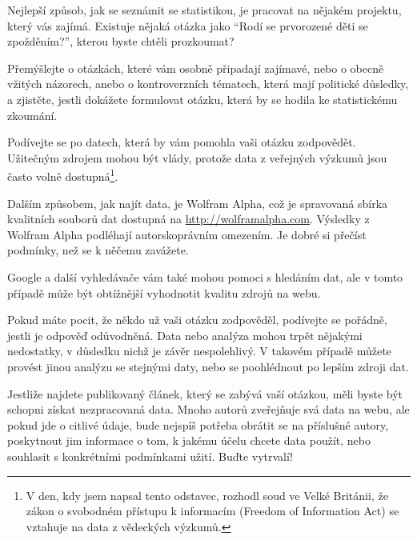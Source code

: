 \documentclass[12pt]{book}
\begin{document}
\begin{exercise}
Nejlepší způsob, jak se seznámit se statistikou, je pracovat na nějakém projektu, který vás zajímá. Existuje nějaká otázka jako ``Rodí se prvorozené děti se zpožděním?'', kterou byste chtěli prozkoumat?

Přemýšlejte o otázkách, které vám osobně připadají zajímavé, nebo o obecně vžitých názorech, anebo o kontroverzních tématech, která mají politické důsledky, a zjistěte, jestli dokážete formulovat otázku, která by se hodila ke statistickému zkoumání.

Podívejte se po datech, která by vám pomohla vaši otázku zodpovědět. Užitečným zdrojem mohou být vlády, protože data z veřejných výzkumů jsou často volně dostupná\footnote{V den, kdy jsem napsal tento odstavec, rozhodl soud ve Velké Británii, že zákon o svobodném přístupu k informacím (Freedom of Information Act) se vztahuje na data z vědeckých výzkumů.}.

Dalším způsobem, jak najít data, je Wolfram Alpha, což je spravovaná sbírka kvalitních souborů dat dostupná na
\url{http://wolframalpha.com}.
Výsledky z Wolfram Alpha podléhají autorskoprávním omezením. Je dobré si přečíst podmínky, než se k něčemu zavážete.

Google a další vyhledávače vám také mohou pomoci s hledáním dat, ale v tomto případě může být obtížnější vyhodnotit kvalitu zdrojů na webu.

Pokud máte pocit, že někdo už vaši otázku zodpověděl, podívejte se pořádně, jestli je odpověď odůvodněná. Data nebo analýza mohou trpět nějakými nedostatky, v důsledku nichž je závěr nespolehlivý. V takovém případě můžete provést jinou analýzu se stejnými daty, nebo se poohlédnout po lepším zdroji dat.

Jestliže najdete publikovaný článek, který se zabývá vaší otázkou, měli byste být schopni získat nezpracovaná data. Mnoho autorů zveřejňuje svá data na webu, ale pokud jde o citlivé údaje, bude nejspíš potřeba obrátit se na příslušné autory, poskytnout jim informace o tom, k jakému účelu chcete data použít, nebo souhlasit s konkrétními podmínkami užití. Buďte vytrvalí!
\end{exercise}
\end{document}
